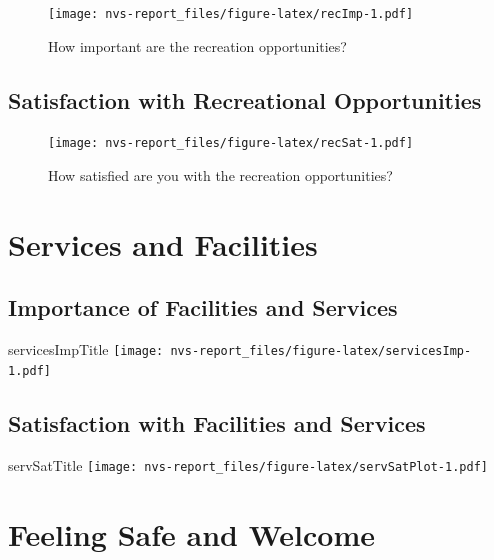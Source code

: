 \documentclass[]{book}
\begin{document}
\begin{figure}
\centering
\texttt{[image: nvs-report\_files/figure-latex/recImp-1.pdf]}
\caption{\label{fig:recImp}How important are the recreation opportunities?}
\end{figure}

\subsection{Satisfaction with Recreational
Opportunities}\label{satisfaction-with-recreational-opportunities}

\begin{figure}
\centering
\texttt{[image: nvs-report\_files/figure-latex/recSat-1.pdf]}
\caption{\label{fig:recSat}How satisfied are you with the recreation
opportunities?}
\end{figure}

\section{Services and Facilities}\label{services-and-facilities}

\subsection{Importance of Facilities and
Services}\label{importance-of-facilities-and-services}

servicesImpTitle
\texttt{[image: nvs-report\_files/figure-latex/servicesImp-1.pdf]}

\subsection{Satisfaction with Facilities and
Services}\label{satisfaction-with-facilities-and-services}

servSatTitle
\texttt{[image: nvs-report\_files/figure-latex/servSatPlot-1.pdf]}

\section{Feeling Safe and Welcome}\label{feeling-safe-and-welcome}
\end{document}
